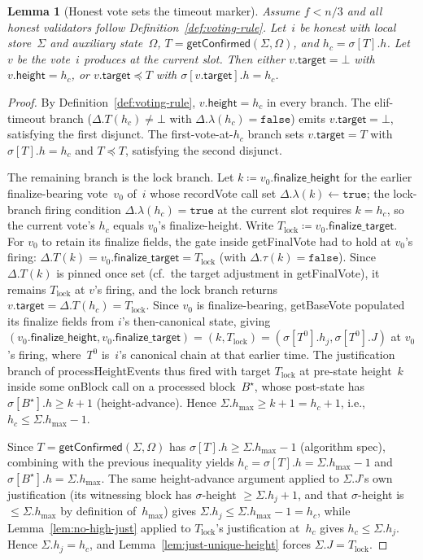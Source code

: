 \ifx\litemode\undefined\documentclass{article}\fi
\newcommand{\target}{\mathsf{target}}
\newcommand{\height}{\mathsf{height}}
\newcommand{\finalizeHeight}{\mathsf{finalize\_height}}
\newcommand{\finalizeTarget}{\mathsf{finalize\_target}}
\newcommand{\hmax}{\ensuremath{h_{\max}}\xspace}
\newcommand{\processHeightEvents}{\textsf{processHeightEvents}\xspace}
\newcommand{\getBaseVote}{\textsf{getBaseVote}\xspace}
\newcommand{\getFinalVote}{\textsf{getFinalVote}\xspace}
\newcommand{\recordVote}{\textsf{recordVote}\xspace}
\newcommand{\onBlock}{\textsf{onBlock}\xspace}
\newcommand{\getConfirmed}{\textsf{getConfirmed}\xspace}
\theoremstyle{plain}
\newtheorem{lemma}{Lemma}
\theoremstyle{definition}
\theoremstyle{remark}
\begin{document}
\begin{lemma}[Honest vote sets the timeout marker]\label{lem:honest-vote-sets-timeout}
Assume $f < n/3$ and all honest validators follow Definition~\ref{def:voting-rule}.
Let~$i$ be honest with local store~$\Sigma$ and auxiliary state~$\Omega$, $T = \getConfirmed(\Sigma, \Omega)$, and $h_c = \sigma[T].h$.
Let~$v$ be the vote~$i$ produces at the current slot.
Then either $v.\target = \bot$ with $v.\height = h_c$, or $v.\target \preceq T$ with $\sigma[v.\target].h = h_c$.
\end{lemma}

\begin{proof}
By Definition~\ref{def:voting-rule}, $v.\height = h_c$ in every branch.
The elif-timeout branch ($\Delta.T(h_c) \neq \bot$ with $\Delta.\lambda(h_c) = \mathtt{false}$) emits $v.\target = \bot$, satisfying the first disjunct.
The first-vote-at-$h_c$ branch sets $v.\target = T$ with $\sigma[T].h = h_c$ and $T \preceq T$, satisfying the second disjunct.

The remaining branch is the lock branch.
Let $k \coloneqq v_0.\finalizeHeight$ for the earlier finalize-bearing vote~$v_0$ of~$i$ whose \recordVote call set $\Delta.\lambda(k) \gets \mathtt{true}$; the lock-branch firing condition $\Delta.\lambda(h_c) = \mathtt{true}$ at the current slot requires $k = h_c$, so the current vote's $h_c$ equals $v_0$'s finalize-height.
Write $T_{\mathrm{lock}} \coloneqq v_0.\finalizeTarget$.
For $v_0$ to retain its finalize fields, the gate inside \getFinalVote had to hold at $v_0$'s firing: $\Delta.T(k) = v_0.\finalizeTarget = T_{\mathrm{lock}}$ (with $\Delta.\tau(k) = \mathtt{false}$).
Since $\Delta.T(k)$ is pinned once set (cf.\ the target adjustment in \getFinalVote), it remains $T_{\mathrm{lock}}$ at $v$'s firing, and the lock branch returns $v.\target = \Delta.T(h_c) = T_{\mathrm{lock}}$.
Since $v_0$ is finalize-bearing, \getBaseVote populated its finalize fields from $i$'s then-canonical state, giving $(v_0.\finalizeHeight, v_0.\finalizeTarget) = (k, T_{\mathrm{lock}}) = (\sigma[T^0].h_j, \sigma[T^0].J)$ at $v_0$'s firing, where~$T^0$ is~$i$'s canonical chain at that earlier time.
The justification branch of \processHeightEvents thus fired with target $T_{\mathrm{lock}}$ at pre-state height~$k$ inside some \onBlock call on a processed block~$B^\star$, whose post-state has $\sigma[B^\star].h \geq k + 1$ (height-advance).
Hence $\Sigma.\hmax \geq k + 1 = h_c + 1$, i.e., $h_c \leq \Sigma.\hmax - 1$.

Since $T = \getConfirmed(\Sigma, \Omega)$ has $\sigma[T].h \geq \Sigma.\hmax - 1$ (algorithm spec), combining with the previous inequality yields $h_c = \sigma[T].h = \Sigma.\hmax - 1$ and $\sigma[B^\star].h = \Sigma.\hmax$.
The same height-advance argument applied to $\Sigma.J$'s own justification (its witnessing block has $\sigma$-height $\geq \Sigma.h_j + 1$, and that $\sigma$-height is $\leq \Sigma.\hmax$ by definition of~$\hmax$) gives $\Sigma.h_j \leq \Sigma.\hmax - 1 = h_c$, while Lemma~\ref{lem:no-high-just} applied to $T_{\mathrm{lock}}$'s justification at~$h_c$ gives $h_c \leq \Sigma.h_j$.
Hence $\Sigma.h_j = h_c$, and Lemma~\ref{lem:just-unique-height} forces $\Sigma.J = T_{\mathrm{lock}}$.


\end{proof}
\end{document}
